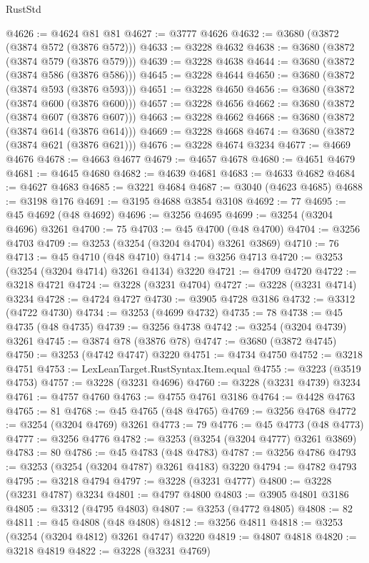 \begin{lexlean}{RustStd}
\begin{coremodule}
@4626 := @4624 @81 @81
@4627 := @3777 @4626
@4632 := @3680 (@3872 (@3874 @572 (@3876 @572)))
@4633 := @3228 @4632
@4638 := @3680 (@3872 (@3874 @579 (@3876 @579)))
@4639 := @3228 @4638
@4644 := @3680 (@3872 (@3874 @586 (@3876 @586)))
@4645 := @3228 @4644
@4650 := @3680 (@3872 (@3874 @593 (@3876 @593)))
@4651 := @3228 @4650
@4656 := @3680 (@3872 (@3874 @600 (@3876 @600)))
@4657 := @3228 @4656
@4662 := @3680 (@3872 (@3874 @607 (@3876 @607)))
@4663 := @3228 @4662
@4668 := @3680 (@3872 (@3874 @614 (@3876 @614)))
@4669 := @3228 @4668
@4674 := @3680 (@3872 (@3874 @621 (@3876 @621)))
@4676 := @3228 @4674 @3234
@4677 := @4669 @4676
@4678 := @4663 @4677
@4679 := @4657 @4678
@4680 := @4651 @4679
@4681 := @4645 @4680
@4682 := @4639 @4681
@4683 := @4633 @4682
@4684 := @4627 @4683
@4685 := @3221 @4684
@4687 := @3040 (@4623 @4685)
@4688 := @3198 @176
@4691 := @3195 @4688 @3854 @3108
@4692 := 77
@4695 := @45 @4692 (@48 @4692)
@4696 := @3256 @4695
@4699 := @3254 (@3204 @4696) @3261
@4700 := 75
@4703 := @45 @4700 (@48 @4700)
@4704 := @3256 @4703
@4709 := @3253 (@3254 (@3204 @4704) @3261 @3869)
@4710 := 76
@4713 := @45 @4710 (@48 @4710)
@4714 := @3256 @4713
@4720 := @3253 (@3254 (@3204 @4714) @3261 @4134) @3220
@4721 := @4709 @4720
@4722 := @3218 @4721
@4724 := @3228 (@3231 @4704)
@4727 := @3228 (@3231 @4714) @3234
@4728 := @4724 @4727
@4730 := @3905 @4728 @3186
@4732 := @3312 (@4722 @4730)
@4734 := @3253 (@4699 @4732)
@4735 := 78
@4738 := @45 @4735 (@48 @4735)
@4739 := @3256 @4738
@4742 := @3254 (@3204 @4739) @3261
@4745 := @3874 @78 (@3876 @78)
@4747 := @3680 (@3872 @4745)
@4750 := @3253 (@4742 @4747) @3220
@4751 := @4734 @4750
@4752 := @3218 @4751
@4753 := LexLeanTarget.RustSyntax.Item.equal
@4755 := @3223 (@3519 @4753)
@4757 := @3228 (@3231 @4696)
@4760 := @3228 (@3231 @4739) @3234
@4761 := @4757 @4760
@4763 := @4755 @4761 @3186
@4764 := @4428 @4763
@4765 := 81
@4768 := @45 @4765 (@48 @4765)
@4769 := @3256 @4768
@4772 := @3254 (@3204 @4769) @3261
@4773 := 79
@4776 := @45 @4773 (@48 @4773)
@4777 := @3256 @4776
@4782 := @3253 (@3254 (@3204 @4777) @3261 @3869)
@4783 := 80
@4786 := @45 @4783 (@48 @4783)
@4787 := @3256 @4786
@4793 := @3253 (@3254 (@3204 @4787) @3261 @4183) @3220
@4794 := @4782 @4793
@4795 := @3218 @4794
@4797 := @3228 (@3231 @4777)
@4800 := @3228 (@3231 @4787) @3234
@4801 := @4797 @4800
@4803 := @3905 @4801 @3186
@4805 := @3312 (@4795 @4803)
@4807 := @3253 (@4772 @4805)
@4808 := 82
@4811 := @45 @4808 (@48 @4808)
@4812 := @3256 @4811
@4818 := @3253 (@3254 (@3204 @4812) @3261 @4747) @3220
@4819 := @4807 @4818
@4820 := @3218 @4819
@4822 := @3228 (@3231 @4769)

\end{coremodule}
\end{lexlean}
